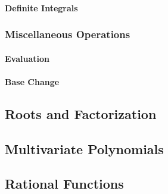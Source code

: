 \paragraph{Definite Integrals}


\subsubsection{Miscellaneous Operations}

\paragraph{Evaluation}

\paragraph{Base Change}



\subsection{Roots and Factorization}




\subsection{Multivariate Polynomials}



\subsection{Rational Functions}




